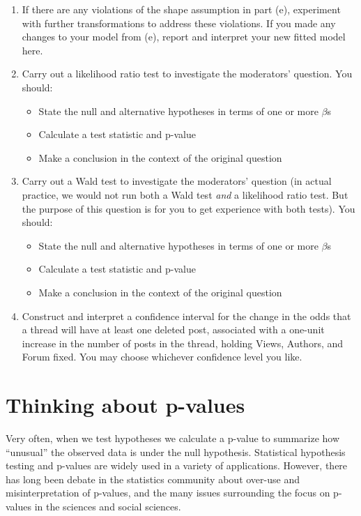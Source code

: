\documentclass[11pt]{article}
\begin{document}
\begin{enumerate}
\begin{enumerate}
\item If there are any violations of the shape assumption in part (e), experiment with further transformations to address these violations. If you made any changes to your model from (e), report and interpret your new fitted model here.
\item Carry out a likelihood ratio test to investigate the moderators' question. You should:
\begin{itemize}
\item State the null and alternative hypotheses in terms of one or more $\beta$s
\item Calculate a test statistic and p-value
\item Make a conclusion in the context of the original question
\end{itemize}

\item Carry out a Wald test to investigate the moderators' question (in actual practice, we would not run both a Wald test \textit{and} a likelihood ratio test. But the purpose of this question is for you to get experience with both tests). You should:
\begin{itemize}
\item State the null and alternative hypotheses in terms of one or more $\beta$s
\item Calculate a test statistic and p-value
\item Make a conclusion in the context of the original question
\end{itemize}

\item Construct and interpret a confidence interval for the change in the odds that a thread will have at least one deleted post, associated with a one-unit increase in the number of posts in the thread, holding Views, Authors, and Forum fixed. You may choose whichever confidence level you like.
\end{enumerate} 
\end{enumerate}

\vspace{1cm}

\section{Thinking about p-values}

Very often, when we test hypotheses we calculate a p-value to summarize how ``unusual'' the observed data is under the null hypothesis. Statistical hypothesis testing and p-values are widely used in a variety of applications. However, there has long been debate in the statistics community about over-use and misinterpretation of p-values, and the many issues surrounding the focus on p-values in the sciences and social sciences.\\
\end{document}

